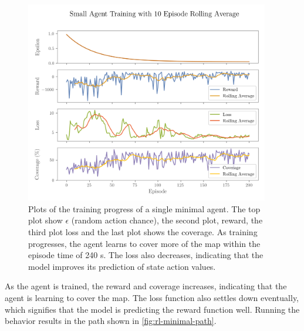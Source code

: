 \begin{figure}[H]
    \centering
    \includegraphics[width=0.95\textwidth]{figures/rl/small-search-agent-training.png}
    \caption{Plots of the training progress of a single minimal agent. The top plot show $\epsilon$ (random action chance), the second plot, reward, the third plot loss and the last plot shows the coverage. As training progresses, the agent learns to cover more of the map within the episode time of 240 s. The loss also decreases, indicating that the model improves its prediction of state action values.}
    \label{fig:rl-minimal-training}
\end{figure}

As the agent is trained, the reward and coverage increases, indicating that the agent is learning to cover the map. The loss function also settles down eventually, which signifies that the model is predicting the reward function well. Running the behavior results in the path shown in \cref{fig:rl-minimal-path}.

